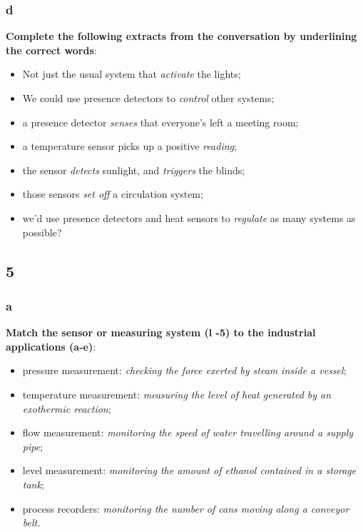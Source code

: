 \subsubsection{d}

\textbf{Complete the following extracts from the conversation by underlining the correct words}:

\begin{itemize}

\item Not just the usual system that \textit{activate} the lights;
\item We could use presence detectors to \textit{control} other systems;
\item a presence detector \textit{senses} that everyone's left a meeting room;
\item a temperature sensor picks up a positive \textit{reading};
\item the sensor \textit{detects} sunlight, and \textit{triggers} the blinds;
\item those sensors \textit{set off} a circulation system;
\item we'd use presence detectors and heat sensors to \textit{regulate} as many systems as possible?

\end{itemize}

\subsection{5}

\subsubsection{a}

\textbf{Match the sensor or measuring system (l -5) to the industrial applications (a-e)}:

\begin{itemize}

\item pressure measurement: \textit{checking the force exerted by steam inside a vessel};
\item temperature measurement: \textit{ measuring the level of heat generated by an exothermic reaction};
\item flow measurement: \textit{monitoring the speed of water travelling around a supply pipe};
\item level measurement: \textit{monitoring the amount of ethanol contained in a storage tank};
\item process recorders: \textit{monitoring the number of cans moving along a conveyor belt}.

\end{itemize}

